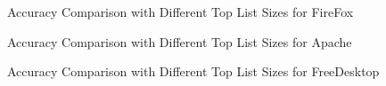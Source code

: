 
\begin{figure}[t]
\centerline{\epsfxsize=3.3in }
\caption{Accuracy Comparison with Different Top List Sizes for FireFox}
\label{firefox}
\end{figure}


\begin{figure}[t]
\centerline{\epsfxsize=3.3in }
\caption{Accuracy Comparison with Different Top List Sizes for Apache}
\label{apache}
\end{figure}


\begin{figure}[t]
\centerline{\epsfxsize=3.3in }
\caption{Accuracy Comparison with Different Top List Sizes for FreeDesktop}
\label{freedesktop}
\end{figure}



